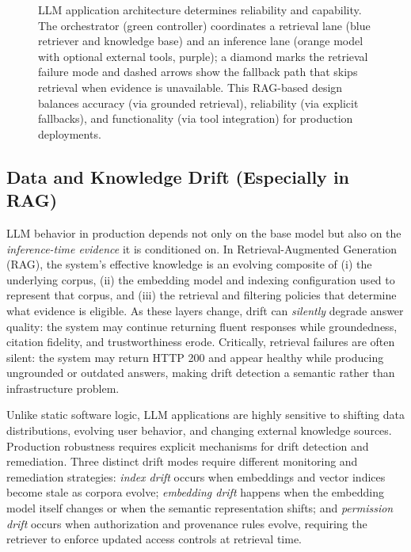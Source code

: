 \begin{figure}[t]
\begin{llmfigbox}
\begin{tikzpicture}
\end{tikzpicture}
\end{llmfigbox}
\caption{LLM application architecture determines reliability and capability. The orchestrator (green controller) coordinates a retrieval lane (blue retriever and knowledge base) and an inference lane (orange model with optional external tools, purple); a diamond marks the retrieval failure mode and dashed arrows show the fallback path that skips retrieval when evidence is unavailable. This RAG-based design balances accuracy (via grounded retrieval), reliability (via explicit fallbacks), and functionality (via tool integration) for production deployments.}
\label{fig:ch01_architecture}
\end{figure}

\subsection{Data and Knowledge Drift (Especially in RAG)}
LLM behavior in production depends not only on the base model but also on the
\emph{inference-time evidence} it is conditioned on. In Retrieval-Augmented Generation (RAG),
the system's effective knowledge is an evolving composite of (i) the underlying corpus,
(ii) the embedding model and indexing configuration used to represent that corpus,
and (iii) the retrieval and filtering policies that determine what evidence is eligible.
As these layers change, drift can \emph{silently} degrade answer quality: the system may
continue returning fluent responses while groundedness, citation fidelity, and trustworthiness erode.
Critically, retrieval failures are often silent: the system may return HTTP 200 and appear healthy
while producing ungrounded or outdated answers, making drift detection a semantic rather than
infrastructure problem.

Unlike static software logic, LLM applications are highly sensitive to shifting data distributions,
evolving user behavior, and changing external knowledge sources. Production robustness requires
explicit mechanisms for drift detection and remediation. Three distinct drift modes require
different monitoring and remediation strategies: \emph{index drift} occurs when embeddings and
vector indices become stale as corpora evolve; \emph{embedding drift} happens when the embedding
model itself changes or when the semantic representation shifts; and \emph{permission drift} occurs
when authorization and provenance rules evolve, requiring the retriever to enforce updated access
controls at retrieval time.


